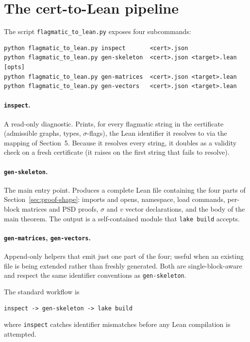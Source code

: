 \documentclass[11pt]{article}
\begin{document}
\section{The cert-to-Lean pipeline}

The script \texttt{flagmatic\_to\_lean.py} exposes four subcommands:

\begin{lstlisting}[language={}]
python flagmatic_to_lean.py inspect       <cert>.json
python flagmatic_to_lean.py gen-skeleton  <cert>.json <target>.lean [opts]
python flagmatic_to_lean.py gen-matrices  <cert>.json <target>.lean
python flagmatic_to_lean.py gen-vectors   <cert>.json <target>.lean
\end{lstlisting}

\paragraph{\texttt{inspect}.} A read-only diagnostic. Prints, for every
flagmatic string in the certificate (admissible graphs, types,
$\sigma$-flags), the Lean identifier it resolves to via the mapping of
Section~5. Because it resolves every string, it doubles as a validity
check on a fresh certificate (it raises on the first string that fails to
resolve).

\paragraph{\texttt{gen-skeleton}.} The main entry point. Produces a
complete Lean file containing the four parts of
Section~\ref{sec:proof-shape}: imports and opens, namespace, load
commands, per-block matrices and PSD proofs, $\sigma$ and $v$ vector
declarations, and the body of the main theorem. The output is a
self-contained module that \texttt{lake build} accepts.

\paragraph{\texttt{gen-matrices}, \texttt{gen-vectors}.} Append-only
helpers that emit just one part of the four; useful when an existing
file is being extended rather than freshly generated. Both are
single-block-aware and respect the same identifier conventions as
\texttt{gen-skeleton}.

The standard workflow is
\begin{lstlisting}[language={}]
inspect -> gen-skeleton -> lake build
\end{lstlisting}
where \texttt{inspect} catches identifier mismatches before any Lean
compilation is attempted.
\end{document}
